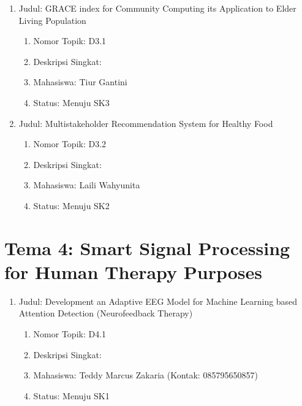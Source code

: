\documentclass[
  letterpaper,
  DIV=11,
  numbers=noendperiod]{scrreprt}
\providecommand{\tightlist}{%
  \setlength{\itemsep}{0pt}\setlength{\parskip}{0pt}}
\begin{document}
\begin{enumerate}
\def\labelenumi{\arabic{enumi}.}
\tightlist
\item
  Judul: GRACE index for Community Computing its Application to Elder
  Living Population

  \begin{enumerate}
  \def\labelenumii{\arabic{enumii}.}
  \tightlist
  \item
    Nomor Topik: D3.1
  \item
    Deskripsi Singkat:
  \item
    Mahasiswa: Tiur Gantini
  \item
    Status: Menuju SK3
  \end{enumerate}
\item
  Judul: Multistakeholder Recommendation System for Healthy Food

  \begin{enumerate}
  \def\labelenumii{\arabic{enumii}.}
  \tightlist
  \item
    Nomor Topik: D3.2
  \item
    Deskripsi Singkat:
  \item
    Mahasiswa: Laili Wahyunita
  \item
    Status: Menuju SK2
  \end{enumerate}
\end{enumerate}

\section{Tema 4: Smart Signal Processing for Human Therapy
Purposes}\label{tema-4-smart-signal-processing-for-human-therapy-purposes-1}

\begin{enumerate}
\def\labelenumi{\arabic{enumi}.}
\tightlist
\item
  Judul: Development an Adaptive EEG Model for Machine Learning based
  Attention Detection (Neurofeedback Therapy)

  \begin{enumerate}
  \def\labelenumii{\arabic{enumii}.}
  \tightlist
  \item
    Nomor Topik: D4.1
  \item
    Deskripsi Singkat:
  \item
    Mahasiswa: Teddy Marcus Zakaria (Kontak: 085795650857)
  \item
    Status: Menuju SK1
  \end{enumerate}
\end{enumerate}
\end{document}
